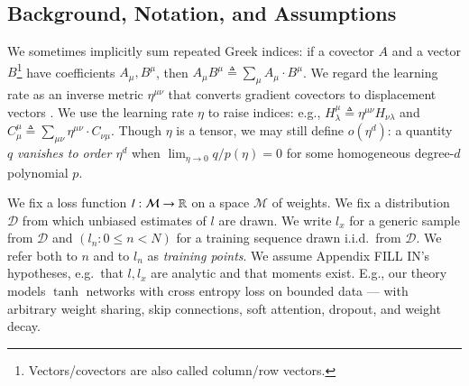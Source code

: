 \documentclass{article}
\theoremstyle{plain}
\theoremstyle{definition}
\newcommand{\Dd}{\mathcal{D}}
\newcommand{\Mm}{\mathcal{M}}
\begin{document}
\subsection{Background, Notation, and Assumptions} \label{sect:background}
       

        We sometimes implicitly sum repeated Greek indices: if a covector $A$
        and a vector $B$\footnote{
            Vectors/covectors are also called column/row vectors.
        } have coefficients $A_\mu, B^\mu$, then 
        $
            A_\mu B^\mu
            \triangleq
            \sum_\mu A_\mu \cdot B^\mu
        $.
        We regard the learning rate as an
        inverse metric $\eta^{\mu\nu}$ that converts gradient covectors to
        displacement vectors \citep{bo13}.  We use the learning rate
        $\eta$ to raise indices: e.g.,
        $
            H^{\mu}_{\lambda}
            \triangleq
            \eta^{\mu\nu} H_{\nu\lambda}
        $ and
        $
            C^{\mu}_{\mu}
            \triangleq
            \sum_{\mu \nu} \eta^{\mu\nu} \cdot C_{\nu\mu}
        $.
        Though $\eta$ is a tensor, we may still define $o(\eta^d)$: a quantity
        $q$ \emph{vanishes to order $\eta^d$} when $\lim_{\eta\to 0} q/p(\eta)
        = 0$ for some homogeneous degree-$d$ polynomial $p$.




        We fix a loss function $l:\Mm\to\RR$ on a space $\Mm$ of weights.  We
        fix a distribution $\Dd$ from which unbiased estimates of $l$ are
        drawn.  We write $l_x$ for a generic sample from $\Dd$ and $(l_n: 0\leq
        n<N)$ for a training sequence drawn i.i.d.\ from $\Dd$.  We refer both
        to $n$ and to $l_n$ as \emph{training points}.  We assume Appendix
        {\color{red} FILL IN}'s hypotheses, e.g.\ that $l, l_x$ are
        analytic and that moments exist.
        E.g., our theory models $\tanh$ networks with cross entropy loss on
        bounded data --- with arbitrary weight sharing, skip connections, soft
        attention, dropout, and weight decay.
        
\end{document}
